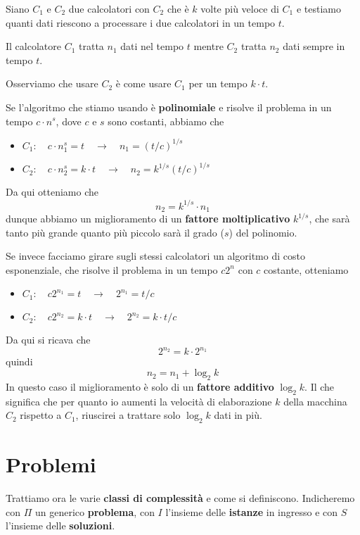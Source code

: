 \begin{example}
	Siano $C_1$ e $C_2$ due calcolatori con $C_2$ che \`e $k$ volte pi\`u veloce di $C_1$ e testiamo quanti dati
	riescono a processare i due calcolatori in un tempo $t$.

	Il calcolatore $C_1$ tratta $n_1$ dati nel tempo $t$ mentre $C_2$ tratta $n_2$ dati sempre in tempo $t$.

	Osserviamo che usare $C_2$ \`e come usare $C_1$ per un tempo $k \cdot t$.

	Se l'algoritmo che stiamo usando \`e \textbf{polinomiale} e risolve il problema in un tempo $c \cdot n^s$, dove
	$c$ e $s$ sono costanti, abbiamo che
	\begin{itemize}
		\item $C_1 : \quad c \cdot n_1^s = t \quad \rightarrow \quad n_1 = (t / c)^{1/s}$
		\item $C_2 : \quad c \cdot n_2^s = k \cdot t \quad \rightarrow \quad n_2 = k^{1/s}(t / c)^{1/s}$
	\end{itemize}
	Da qui otteniamo che
	\[ n_2 = k^{1/s} \cdot n_1 \]
	dunque abbiamo un miglioramento di un \textbf{fattore moltiplicativo} $k^{1/s}$, che sar\`a tanto pi\`u grande
	quanto pi\`u piccolo sar\`a il grado ($s$) del polinomio.

	Se invece facciamo girare sugli stessi calcolatori un algoritmo di costo esponenziale, che risolve il problema in
	un tempo $c 2^n$ con $c$ costante, otteniamo
	\begin{itemize}
		\item $C_1 : \quad c 2^{n_1} = t \quad \rightarrow \quad 2^{n_1} = t / c$
		\item $C_2 : \quad c 2^{n_2} = k \cdot t \quad \rightarrow \quad 2^{n_2} = k \cdot t/c$
	\end{itemize}
	Da qui si ricava che
	\[ 2^{n_2} = k \cdot 2^{n_1} \]
	quindi
	\[ n_2 = n_1 + \log_2 k \]
	In questo caso il miglioramento \`e solo di un \textbf{fattore additivo} $\log_2 k$. Il che significa che per quanto
	io aumenti la velocit\`a di elaborazione $k$ della macchina $C_2$ rispetto a $C_1$, riuscirei a trattare solo
	$\log_2 k$ dati in pi\`u.
\end{example}

\section{Problemi}
Trattiamo ora le varie \textbf{classi di complessit\`a} e come si definiscono. Indicheremo con $\Pi$ un generico
\textbf{problema}, con $I$ l'insieme delle \textbf{istanze} in ingresso e con $S$ l'insieme delle \textbf{soluzioni}.

